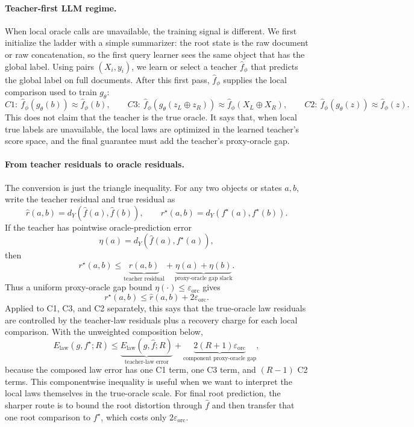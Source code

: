 \paragraph{Teacher-first LLM regime.}
When local oracle calls are unavailable, the training signal is
different. We first initialize the ladder with a simple summarizer:
the root state is the raw document or raw concatenation, so the first
query learner sees the same object that has the global label. Using
pairs \((X_i,y_i)\), we learn or select a teacher
\(\widehat f_\phi\) that predicts the global label on full documents.
After this first pass, \(\widehat f_\phi\) supplies the local
comparison used to train \(g_\theta\):
\[
  C1:\ \widehat f_\phi(g_\theta(b))\approx \widehat f_\phi(b),
  \qquad
  C3:\ \widehat f_\phi(g_\theta(z_L\oplus z_R))
      \approx \widehat f_\phi(X_L\oplus X_R),
  \qquad
  C2:\ \widehat f_\phi(g_\theta(z))\approx \widehat f_\phi(z).
\]
This does not claim that the teacher is the true oracle. It says that,
when local true labels are unavailable, the local laws are optimized in
the learned teacher's score space, and the final guarantee must add the
teacher's proxy-oracle gap.

\paragraph{From teacher residuals to oracle residuals.}
The conversion is just the triangle inequality. For any two objects or
states \(a,b\), write the teacher residual and true residual as
\[
  \widehat r(a,b)=d_Y(\widehat f(a),\widehat f(b)),
  \qquad
  r^\star(a,b)=d_Y(f^\star(a),f^\star(b)).
\]
If the teacher has pointwise oracle-prediction error
\[
  \eta(a)=d_Y(\widehat f(a),f^\star(a)),
\]
then
\[
  r^\star(a,b)
  \le
  \underbrace{\widehat r(a,b)}_{\text{teacher residual}}
  +
  \underbrace{\eta(a)+\eta(b)}_{\text{proxy-oracle gap slack}}.
\]
Thus a uniform proxy-oracle gap bound
\(\eta(\cdot)\le\varepsilon_{\mathrm{orc}}\) gives
\[
  r^\star(a,b)\le \widehat r(a,b)+2\varepsilon_{\mathrm{orc}}.
\]
Applied to C1, C3, and C2 separately, this says that the true-oracle
law residuals are controlled by the teacher-law residuals plus a
recovery charge for each local comparison. With the unweighted
composition below,
\[
  E_{\mathrm{law}}(g,f^\star;R)
  \le
  \underbrace{E_{\mathrm{law}}(g,\widehat f;R)}
    _{\text{teacher-law error}}
  +
  \underbrace{2(R+1)\varepsilon_{\mathrm{orc}}}
    _{\text{component proxy-oracle gap}},
\]
because the composed law error has one C1 term, one C3 term, and
\((R-1)\) C2 terms. This componentwise inequality is useful when we
want to interpret the local laws themselves in the true-oracle scale.
For final root prediction, the sharper route is to bound the root
distortion through \(\widehat f\) and then transfer that one root
comparison to \(f^\star\), which costs only
\(2\varepsilon_{\mathrm{orc}}\).

